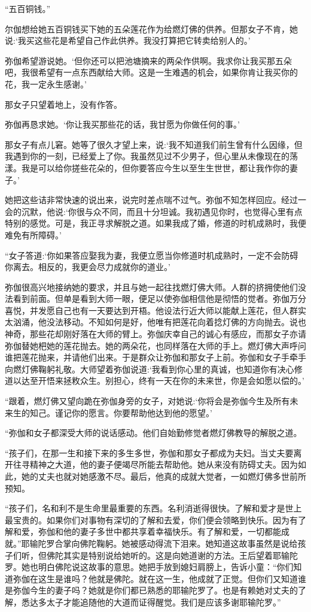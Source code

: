 \documentclass[12pt,twoside,openany]{book}
\begin{document}
“五百铜钱。”

尔伽想给她五百铜钱买下她的五朵莲花作为给燃灯佛的供养。但那女子不肯，她说:‘我买这些花是希望自己作此供养。我没打算把它转卖给别人的。’

弥伽希望游说她。‘但你还可以把池塘摘来的两朵作供啊。我求你让我买那五朵吧，我很希望有一点东西献给大师。这是一生难遇的机会，如果你肯让我买你的花，我一定永生感谢。’

那女子只望着地上，没有作答。

弥伽再恳求她。‘你让我买那些花的话，我甘愿为你做任何的事。’

那女子有点儿窘。她等了很久才望上来，说:‘我不知道我们前生曾有什么因缘，但我遇到你的一刻，已经爱上了你。我虽然见过不少男子，但心里从未像现在的荡漾。我是可以给你搓些花朵的，但你要答应今生以至生生世世，都让我作你的妻子。’

她把这些诘非常快速的说出来，说完时差点喘不过气。弥伽不知怎样回应。经过一会的沉默，他说:‘你很与众不同，而且十分坦诚。我初遇见你时，也觉得心里有点特别的感觉。可是，我正寻求解脱之道。如果我成了婚，修道的时机成熟时，我便难免有所障碍。’

“女子答道:‘你如果答应娶我为妻，我便立愿当你修道时机成熟时，一定不会防碍你离去。相反的，我更会尽力成就你的道业。’

弥伽很高兴地接纳她的要求，并且与她一起往找燃灯佛大师。人群的挤拥使他们没法看到前面。但单是看到大师一眼，便足以使弥伽相信他是彻悟的觉者。弥伽万分喜悦，并发愿自己也有一天要达到开梧。他设法行近大师以能献上莲花，但人群实太汹涌，他没法移动。不知如何是好，他唯有把莲花向着捻灯佛的方向抛去。说也神奇，那些花却刚好落在大师的臂上。弥伽庆幸自己的诚心有感应，而那女子亦请弥伽替她杷她的莲花抛去。她的两朵花，也同样落在大师的手上。燃灯佛大声呼问谁把莲花抛来，并请他们出来。于是群众让弥伽和那女子上前。弥伽和女子手牵手向燃灯佛鞠躬礼敬。大师望着弥伽说道:‘我看到你心里的真诚，也知道你有决心修道以达至开悟来拯敉众生。别担心，终有一天在你的未来世，你是会如愿以偿的。’

“跟着，燃灯佛又望向跪在弥伽身旁的女子，对她说:‘你将会是弥伽今生及所有未来生的知己。谨记你的愿言。你要帮助他达到他的愿望。’

“弥伽和女子都深受大师的说话感动。他们自始勤修觉者燃灯佛教导的解脱之道。

“孩子们，在那一生和接下来的多生多世，弥伽和那女子都成为夫妇。当丈夫要离开往寻精神之大道，他的妻子便竭尽所能去帮助他。她从来没有防碍丈夫。因为如此，她的丈夫也就对她感激不尽。最后，他真的成就大觉者，一如燃灯佛多世前所预知。

“孩子们，名和利不是生命里最重要的东西。名利消逝得很快。了解和爱才是世上最宝贵的。如果你们对事物有深切的了解和去爱，你们便会领略到快乐。因为有了解和爱，弥伽和他的妻子多世中都共享着幸福快乐。有了解和爱，一切都能成就。”耶输陀罗合掌向佛陀鞠躬。她被感动得流下泪来。她知道这故事虽然是说给孩子们听，但佛陀其实是特别说给她听的。这是向她道谢的方法。王后望着耶输陀罗。她也明白佛陀说这故事的意思。她把手放到媳妇肩膀上，告诉小童：“你们知道弥伽在这生是谁吗？他就是佛陀。就在这一生，他成就了正觉。但你们又知道谁是弥伽今生的妻子吗？她就是你们都已熟悉的耶输陀罗了。也是有赖她对丈夫的了解，悉达多太子才能追随他的大道而证得醒觉。我们是应该多谢耶输陀罗。”
\end{document}
